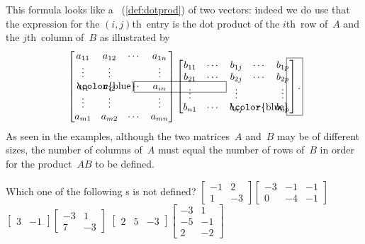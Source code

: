 This formula looks like a ~(\autoref{def:dotprod}) of two vectors: indeed we do use that the expression for the \((i,j)\)th~entry is the dot product of the \(i\)th~row of~\(A\) and the \(j\)th~column of~\(B\) as illustrated by
\begin{equation*}
\begin{bmatrix} a_{11}&a_{12}&\cdots&a_{1n}
\\\vdots&\vdots&&\vdots
\\\rlap{\color{blue}\hspace{-0.2em}\framebox{\phantom{\rule{8.7em}{1ex}}}}
a_{i1}&a_{i2}&\cdots&a_{in}
\\\vdots&\vdots&&\vdots
\\a_{m1}&a_{m2}&\cdots&a_{mn} \end{bmatrix}
\begin{bmatrix} b_{11}&\cdots&b_{1j}&\cdots&b_{1p}
\\b_{21}&\cdots&b_{2j}&\cdots&b_{2p}
\\\vdots&&\vdots&&\vdots
\\b_{n1}&\cdots&
\rlap{\color{blue}\hspace{-0.25em}\smash{\framebox{\phantom{\rule[-0.5ex]{1em}{12ex}}}}}
b_{nj}&\cdots&b_{np} \end{bmatrix}.
\end{equation*}
As seen in the examples, although the two matrices~\(A\) and~\(B\) may be of different sizes, the number of columns of~\(A\) must equal the number of rows of~\(B\) in order for the product~\(AB\) to be defined.




\begin{activity}
Which one of the following s is not defined?
{\(\begin{bmatrix} -1&2
\\1&-3 \end{bmatrix}\begin{bmatrix} -3&-1&-1
\\0&-4&-1 \end{bmatrix}\)}
{\(\begin{bmatrix} 3&-1 \end{bmatrix}\begin{bmatrix} -3&1
\\7&-3 \end{bmatrix}\)}
{\(\begin{bmatrix} 2&5&-3 \end{bmatrix}\begin{bmatrix} -3&1
\\-5&-1
\\2&-2 \end{bmatrix}\)}
\end{activity}




